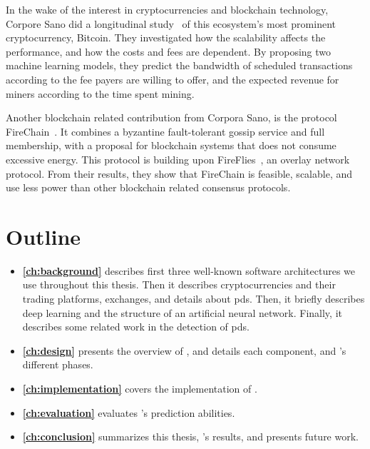 In the wake of the interest in cryptocurrencies and blockchain technology, Corpore Sano did a longitudinal study~\cite{tedeschi2017trading} of this ecosystem's most prominent cryptocurrency, Bitcoin. They investigated how the scalability affects the performance, and how the costs and fees are dependent. By proposing two machine learning models, they predict the bandwidth of scheduled transactions according to the fee payers are willing to offer, and the expected revenue for miners according to the time spent mining.

Another blockchain related contribution from Corpora Sano, is the protocol FireChain~\cite{mikalsen2018firechain}. It combines a byzantine fault-tolerant gossip service and full membership, with a proposal for blockchain systems that does not consume excessive energy. This protocol is building upon FireFlies~\cite{johansen2015fireflies}, an overlay network protocol. From their results, they show that FireChain is feasible, scalable, and use less power than other blockchain related consensus protocols.

\section{Outline}\label{sec:outline}
\begin{itemize}
    \item[] \textbf{\autoref{ch:background}} describes first three well-known software architectures we use throughout this thesis. Then it describes cryptocurrencies and their trading platforms, exchanges, and details about \acp{pd}. Then, it briefly describes deep learning and the structure of an artificial neural network. Finally, it describes some related work in the detection of \acp{pd}. 
    \item[] \textbf{\autoref{ch:design}} presents the overview of \project, and details each component, and \project's different phases. 
    \item[] \textbf{\autoref{ch:implementation}} covers the implementation of \project.
    \item[] \textbf{\autoref{ch:evaluation}} evaluates \project's prediction abilities. 
    \item[] \textbf{\autoref{ch:conclusion}} summarizes this thesis, \project's results, and presents future work.
 \end{itemize}